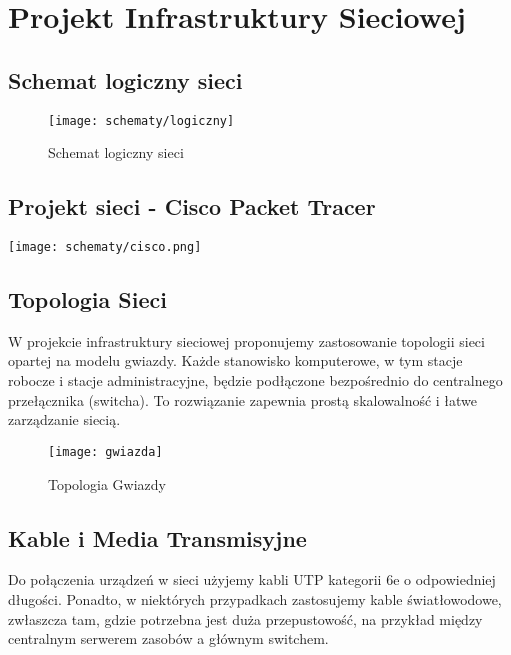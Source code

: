 \section{Projekt Infrastruktury Sieciowej}

\subsection{Schemat logiczny sieci}
        
    \begin{figure}[!htb]
        \centering
        \texttt{[image: schematy/logiczny]}
        \caption{Schemat logiczny sieci}
    \end{figure}

\subsection{Projekt sieci - Cisco Packet Tracer}
    \texttt{[image: schematy/cisco.png]}

\pagebreak

\subsection{Topologia Sieci}

    W projekcie infrastruktury sieciowej proponujemy zastosowanie topologii sieci opartej na modelu gwiazdy. Każde stanowisko komputerowe, w tym stacje robocze i stacje administracyjne, będzie podłączone bezpośrednio do centralnego przełącznika (switcha). To rozwiązanie zapewnia prostą skalowalność i łatwe zarządzanie siecią.

        
    \begin{figure}[!htb]
        \centering
        \texttt{[image: gwiazda]}
        \caption{Topologia Gwiazdy}
    \end{figure}


\subsection{Kable i Media Transmisyjne}

    Do połączenia urządzeń w sieci użyjemy kabli UTP kategorii 6e o odpowiedniej długości. Ponadto, w niektórych przypadkach zastosujemy kable światłowodowe, zwłaszcza tam, gdzie potrzebna jest duża przepustowość, na przykład między centralnym serwerem zasobów a głównym switchem.

